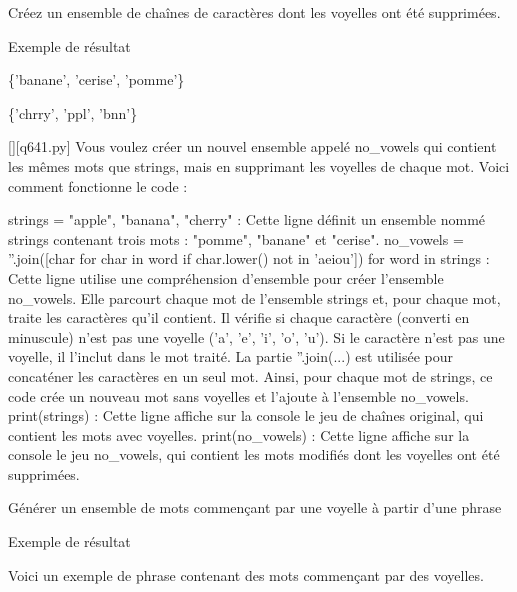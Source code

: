         \question
        Créez un ensemble de chaînes de caractères dont les voyelles ont été supprimées.

Exemple de résultat

\{'banane', 'cerise', 'pomme'\}

\{'chrry', 'ppl', 'bnn'\}
        \par
        \begin{solution}
            \renewcommand{\nomfichier}{q641.py}
            \pythonfile{\chemincode \nomfichier}[][\nomfichier]
            Vous voulez créer un nouvel ensemble appelé no_vowels qui contient les mêmes mots que strings, mais en supprimant les voyelles de chaque mot. Voici comment fonctionne le code :

    strings = {"apple", "banana", "cherry"} : Cette ligne définit un ensemble nommé strings contenant trois mots : "pomme", "banane" et "cerise".
    no_vowels = {''.join([char for char in word if char.lower() not in 'aeiou']) for word in strings} : Cette ligne utilise une compréhension d'ensemble pour créer l'ensemble no_vowels. Elle parcourt chaque mot de l'ensemble strings et, pour chaque mot, traite les caractères qu'il contient. Il vérifie si chaque caractère (converti en minuscule) n'est pas une voyelle ('a', 'e', 'i', 'o', 'u'). Si le caractère n'est pas une voyelle, il l'inclut dans le mot traité. La partie ''.join(...) est utilisée pour concaténer les caractères en un seul mot. Ainsi, pour chaque mot de strings, ce code crée un nouveau mot sans voyelles et l'ajoute à l'ensemble no_vowels.
    print(strings) : Cette ligne affiche sur la console le jeu de chaînes original, qui contient les mots avec voyelles.
    print(no_vowels) : Cette ligne affiche sur la console le jeu no_vowels, qui contient les mots modifiés dont les voyelles ont été supprimées.
        \end{solution}
        

        \question
        Générer un ensemble de mots commençant par une voyelle à partir d'une phrase

Exemple de résultat

Voici un exemple de phrase contenant des mots commençant par des voyelles.

